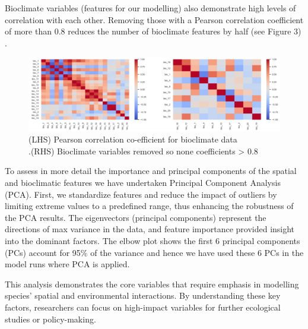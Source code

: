 \documentclass{article}
\begin{document}
Bioclimate variables (features for our modelling) also demonstrate high levels of correlation with each other.  Removing those with a Pearson correlation coefficient of more than 0.8 reduces the number of bioclimate features by half (see Figure 3) .

\begin{figure}[H]
    \centering
    \includegraphics[width=1\linewidth]{Bio_Climate_XC.png}
    \caption{(LHS) Pearson correlation co-efficient for bioclimate data \\.\hspace{1.3cm}(RHS) Bioclimate variables removed so none coefficients > 0.8}
    \label{fig:Pearson correlation}
\end{figure}
To assess in more detail the importance and principal components of the spatial and bioclimatic features we have undertaken Principal Component Analysis (PCA). First, we standardize features and reduce the impact of outliers by limiting extreme values to a predefined range, thus enhancing the robustness of the PCA results. The eigenvectors (principal components) represent the directions of max variance in the data, and feature importance provided insight into the dominant factors.   The elbow plot shows the first 6 principal components (PCs) account for 95\% of the variance and hence we have used these 6 PCs in the model runs where PCA is applied. 

This analysis demonstrates the core variables that require emphasis in modelling species' spatial and environmental interactions. By understanding these key factors, researchers can focus on high-impact variables for further ecological studies or policy-making.
\end{document}
